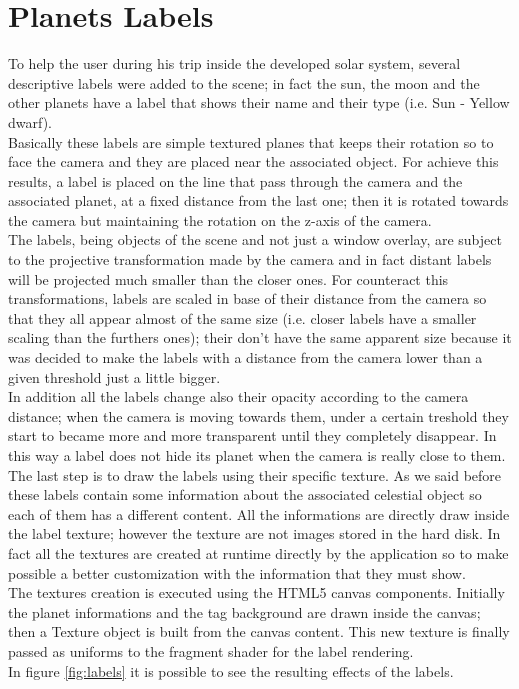 \documentclass[paper=a4, fontsize=11pt]{scrartcl} %
\numberwithin{equation}{section} %
\numberwithin{figure}{section} %
\numberwithin{table}{section} %
\theoremstyle{definition}
\begin{document}

\section{Planets Labels}

To help the user during his trip inside the developed solar system, several descriptive labels were added to the scene; in fact the sun, the moon and the other planets have a label that shows their name and their type (i.e. Sun - Yellow dwarf).\\
Basically these labels are simple textured planes that keeps their rotation so to face the camera and they are placed near the associated object. For achieve this results, a label is placed on the line that pass through the camera and the associated planet, at a fixed distance from the last one; then it is rotated towards the camera but maintaining the rotation on the z-axis of the camera.\\
The labels, being objects of the scene and not just a window overlay, are subject to the projective transformation made by the camera and in fact distant labels will be projected much smaller than the closer ones. For counteract this transformations, labels are scaled in base of their distance from the camera so that they all appear almost of the same size (i.e. closer labels have a smaller scaling than the furthers ones); their don't have the same apparent size because it was decided to make the labels with a distance from the camera lower than a given threshold just a little bigger.\\
In addition all the labels change also their opacity according to the camera distance; when the camera is moving towards them, under a certain treshold they start to became more and more transparent until they completely disappear. In this way a label does not hide its planet when the camera is really close to them.\\
The last step is to draw the labels using their specific texture. As we said before these labels contain some information about the associated celestial object so each of them has a different content. All the informations are directly draw inside the label texture; however the texture are not images stored in the hard disk. In fact all the textures are created at runtime directly by the application so to make possible a better customization with the information that they must show.\\
The textures creation is executed using the HTML5 canvas components. Initially the planet informations and the tag background are drawn inside the canvas; then a Texture object is built from the canvas content. This new texture is finally passed as uniforms to the fragment shader for the label rendering.\\
In figure \ref{fig:labels} it is possible to see the resulting effects of the labels.
\end{document}
